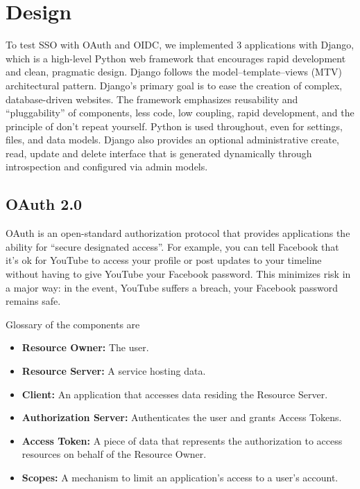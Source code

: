 \section{Design}

To test SSO with OAuth and OIDC, we implemented 3 applications with Django, which is a high-level Python web framework that encourages rapid development and clean, pragmatic design. Django follows the model–template–views (MTV) architectural pattern. Django's primary goal is to ease the creation of complex, database-driven websites. The framework emphasizes reusability and ``pluggability'' of components, less code, low coupling, rapid development, and the principle of don't repeat yourself. Python is used throughout, even for settings, files, and data models. Django also provides an optional administrative create, read, update and delete interface that is generated dynamically through introspection and configured via admin models.



\subsection{OAuth 2.0}

OAuth is an open-standard authorization protocol that provides applications the ability for ``secure designated access''. For example, you can tell Facebook that it’s ok for YouTube to access your profile or post updates to your timeline without having to give YouTube your Facebook password. This minimizes risk in a major way: in the event, YouTube suffers a breach, your Facebook password remains safe.

Glossary of the components are
\begin{itemize}
	
	\item \textbf{Resource Owner:} The user.
	
	\item \textbf{Resource Server:} A service hosting data.
	
	\item \textbf{Client:} An application that accesses data residing the Resource Server.
	
	\item \textbf{Authorization Server:} Authenticates the user and grants Access Tokens.
	
	\item \textbf{Access Token:} A piece of data that represents the authorization to access resources on behalf of the Resource Owner.
	
	\item \textbf{Scopes:} A mechanism to limit an application's access to a user's account.
	
\end{itemize}


